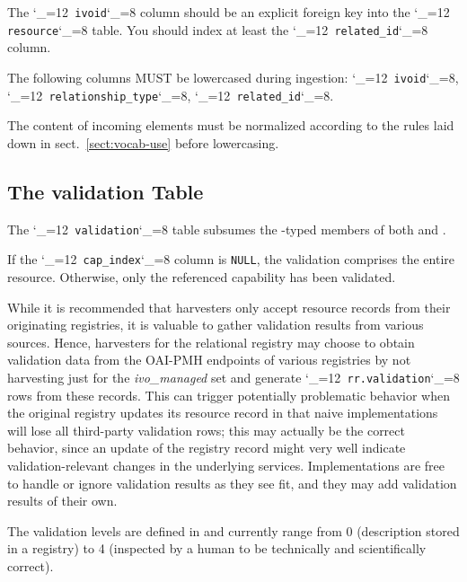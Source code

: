 \documentclass[11pt,a4paper]{ivoa}
\makeatletter
\def\rtent#1{\texttt{\color{rtcolor}\verb|#1|}}
\def\makeunderscoreletter{\catcode`\_=12}
\def\makeunderscoresubscript{\catcode`\_=8}
\def\rtent{\makeunderscoreletter\relax\rt@nt}
\def\rt@nt#1{\texttt{\color{rtcolor} #1}\makeunderscoresubscript{}}
\makeatother
\begin{document}



The \rtent{ivoid} column should be an explicit foreign key into the
\rtent{resource} table.  You should index at least the
\rtent{related_id} column.

The following columns MUST be lowercased during ingestion:
\rtent{ivoid}, \rtent{relationship_type},
\rtent{related_id}.

The content of incoming 
elements must be normalized according to the rules laid down in
sect.~\ref{sect:vocab-use} before lowercasing.


\subsection{The validation Table}

\label{table_validation}

The \rtent{validation} table subsumes the
-typed members of both 
and .

If the \rtent{cap_index} column is \texttt{NULL}, the
validation comprises the entire resource.  Otherwise, only the
referenced capability has been validated.

While it is recommended that harvesters only accept resource records
from their originating registries, it is valuable to gather validation
results from various sources.  Hence, harvesters for the relational
registry may choose to obtain validation data from the OAI-PMH endpoints
of various registries by not harvesting just for the \emph{ivo\_managed} set and
generate \rtent{rr.validation} rows from these records.  This can
trigger potentially problematic behavior when the original registry
updates  its resource record in that naive implementations will lose all
third-party validation rows; this may actually be the correct behavior,
since an update of the registry record might very well indicate
validation-relevant changes in the underlying services.  Implementations
are free to handle or ignore validation results as they see fit, and
they may add validation results of their own.

The validation levels are defined in \citet{2007ivoa.spec.0302H} and
currently range from 0 (description stored in a registry) to
4 (inspected by a human to be technically and scientifically
correct).


\end{document}
